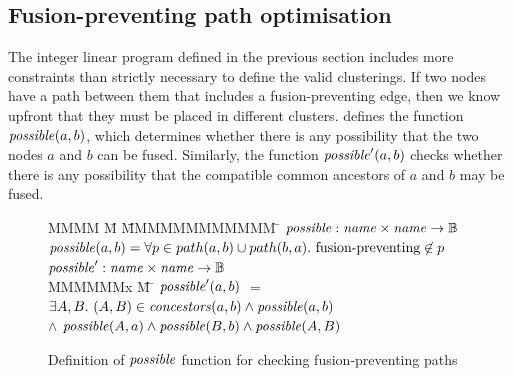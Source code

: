


\subsection{Fusion-preventing path optimisation}
\label{clustering:s:OptimisedConstraints}
The integer linear program defined in the previous section includes more constraints than strictly necessary to define the valid clusterings.
If two nodes have a path between them that includes a fusion-preventing edge, then we know upfront that they must be placed in different clusters.
 defines the function $\mathit{possible}(a,b)$, which determines whether there is any possibility that the two nodes $a$ and $b$ can be fused.
Similarly, the function $\mathit{possible}'(a, b)$ checks whether there is any possibility that the compatible common ancestors of $a$ and $b$ may be fused.

\begin{figure}
\begin{tabbing}
MMMM \= M \=     \= MMMMMMMMMMMM    \=  \kill
$\mathit{possible} : \mathit{name} \times \mathit{name} \to \mathbb{B}$ \\
$\mathit{possible}(a,b) = \forall p \in path(a,b) \cup path(b,a).\ \mbox{fusion-preventing} \not\in p$
\\[1ex]
$\mathit{possible}' : \mathit{name} \times \mathit{name} \to \mathbb{B}$ \\
MMMMMMx        \= M    \= \kill
$\mathit{possible}'(a,b)$ 
        \> $=$   \>$\exists A, B.\ (A,B) \in \mathit{concestors}(a,b) \wedge \mathit{possible}(a,b)$ \\
        \> $\wedge$ \> $\mathit{possible}(A,a) \wedge \mathit{possible}(B,b) \wedge \mathit{possible}(A,B)$
\end{tabbing}
\caption{Definition of $\mathit{possible}$ function for checking fusion-preventing paths}
\label{fig:clustering:possible}
\end{figure}

